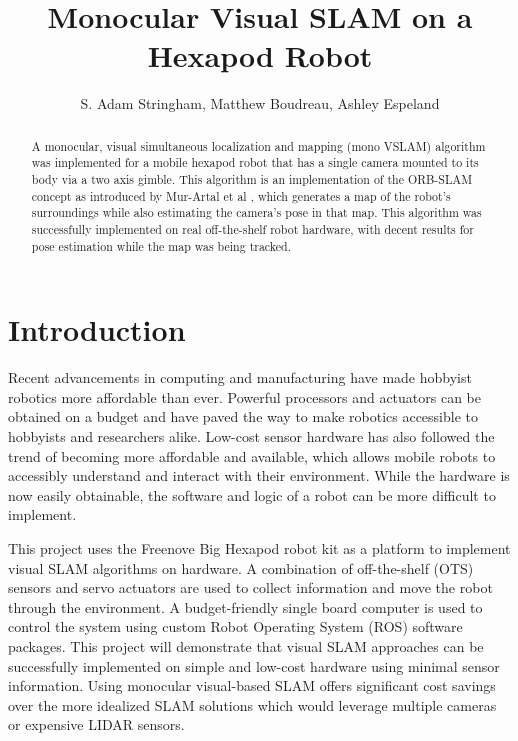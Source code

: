 \documentclass[twocolumn]{article}
\begin{document}
\title{ Monocular Visual SLAM on a Hexapod Robot }

\author{ S. Adam Stringham, Matthew Boudreau, Ashley Espeland }

\maketitle
\thispagestyle{plain}
\pagestyle{plain}

\begin{abstract}

A monocular, visual simultaneous localization and mapping (mono VSLAM) algorithm was implemented for a mobile hexapod robot that has a single camera mounted to its body via a two axis gimble. This algorithm is an implementation of the ORB-SLAM concept as introduced by Mur-Artal et al \cite{ORBSLAM}, which generates a map of the robot's surroundings while also estimating the camera's pose in that map. This algorithm was successfully implemented on real off-the-shelf robot hardware, with decent results for pose estimation while the map was being tracked.

\end{abstract}

\section{Introduction}

Recent advancements in computing and manufacturing have made hobbyist robotics more affordable than ever. Powerful processors and actuators can be obtained on a budget and have paved the way to make robotics accessible to hobbyists and researchers alike. Low-cost sensor hardware has also followed the trend of becoming more affordable and available, which allows mobile robots to accessibly understand and interact with their environment. While the hardware is now easily obtainable, the software and logic of a robot can be more difficult to implement.

This project uses the Freenove Big Hexapod robot kit as a platform to implement visual SLAM algorithms on hardware. A combination of off-the-shelf (OTS) sensors and servo actuators are used to collect information and move the robot through the environment. A budget-friendly single board computer is used to control the system using custom Robot Operating System (ROS) \cite{rosnoetic} software packages. This project will demonstrate that visual SLAM approaches can be successfully implemented on simple and low-cost hardware using minimal sensor information. Using monocular visual-based SLAM offers significant cost savings over the more idealized SLAM solutions which would leverage multiple cameras or expensive LIDAR sensors.
\end{document}
